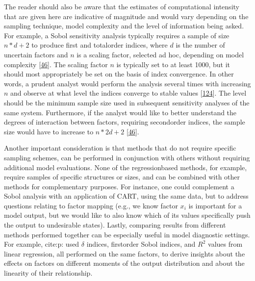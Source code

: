 \documentclass[letterpaper,10pt,english]{sphinxmanual}
\begin{document}
\sphinxAtStartPar
The reader should also be aware that the estimates of computational intensity that are given here are indicative of magnitude and would vary depending on the sampling technique, model complexity and the level of information being asked. For example, a Sobol sensitivity analysis typically requires a sample of size \(n * d+2\) to produce first\sphinxhyphen{} and total\sphinxhyphen{}order indices, where \(d\) is the number of uncertain factors and \(n\) is a scaling factor, selected ad hoc, depending on model complexity {[}\hyperlink{cite.index:id25}{46}{]}. The scaling factor \(n\) is typically set to at least 1000, but it should most appropriately be set on the basis of index convergence. In other words, a prudent analyst would perform the analysis several times with increasing \(n\) and observe at what level the indices converge to stable values {[}\hyperlink{cite.index:id140}{124}{]}. The level should be the minimum sample size used in subsequent sensitivity analyses of the same system. Furthermore, if the analyst would like to better understand the degrees of interaction between factors, requiring second\sphinxhyphen{}order indices, the sample size would have to increase to \(n * 2d+2\) {[}\hyperlink{cite.index:id25}{46}{]}.

\sphinxAtStartPar
Another important consideration is that methods that do not require specific sampling schemes, can be performed in conjunction with others without requiring additional model evaluations. None of the regression\sphinxhyphen{}based methods, for example, require samples of specific structures or sizes, and can be combined with other methods for complementary purposes. For instance, one could complement a Sobol analysis with an application of CART, using the same data, but to address questions relating to factor mapping (e.g., we know factor \(x_i\)  is important for a model output, but we would like to also know which of its values specifically push the output to undesirable states). Lastly, comparing results from different methods performed together can be especially useful in model diagnostic settings. For example, cite:p: used \(\delta\) indices, first\sphinxhyphen{}order Sobol indices, and \(R^2\)  values from linear regression, all performed on the same factors, to derive insights about the effects on factors on different moments of the output distribution and about the linearity of their relationship.
\end{document}
